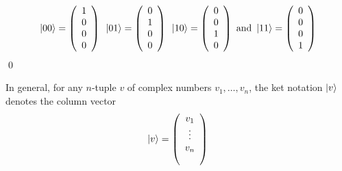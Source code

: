 \documentclass [12pt]{article}
\theoremstyle{definition}
\begin{document}
\[
\ket{00}=\left(\begin{array}{c}
1\\
0 \\
0 \\
0 \\
\end{array}\right)\mbox{  }
\ket{01} =\left(\begin{array}{c}
0\\
1 \\
0 \\
0 \\
\end{array}\right)\mbox{  }
\ket{10}=\left(\begin{array}{c}
0\\
0 \\
1 \\
0 \\
\end{array}\right)\mbox{ and }
\ket{11}=\left(\begin{array}{c}
0\\
0 \\
0 \\
1 \\
\end{array}\right)
\]
\qed

In general, for any $n$-tuple $v$ of complex numbers $v_1,\ldots,v_n$, the ket notation $\ket{v}$ denotes the column vector
\[
\ket{v}=\left(\begin{array}{c}
v_1\\
\vdots \\
v_n \\\\
\end{array}\right)
\]
\end{document}
